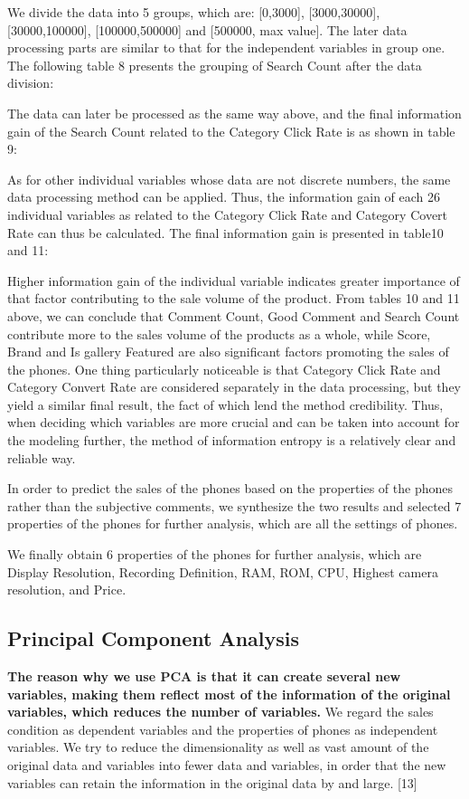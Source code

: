 We divide the data into 5 groups, which are: [0,3000], [3000,30000], [30000,100000], [100000,500000] and [500000, max value]. The later data processing parts are similar to that for the independent variables in group one. The following table 8 presents the grouping of Search Count after the data division:

The data can later be processed as the same way above, and the final information gain of the Search Count related to the Category Click Rate is as shown in table 9:

As for other individual variables whose data are not discrete numbers, the same data processing method can be applied. Thus, the information gain of each 26 individual variables as related to the Category Click Rate and Category Covert Rate can thus be calculated. The final information gain is presented in table10 and 11:

Higher information gain of the individual variable indicates greater importance of that factor contributing to the sale volume of the product. From tables 10 and 11 above, we can conclude that Comment Count, Good Comment and Search Count contribute more to the sales volume of the products as a whole, while Score, Brand and Is gallery Featured are also significant factors promoting the sales of the phones. One thing particularly noticeable is that Category Click Rate and Category Convert Rate are considered separately in the data processing, but they yield a similar final result, the fact of which lend the method credibility. Thus, when deciding which variables are more crucial and can be taken into account for the modeling further, the method of information entropy is a relatively clear and reliable way. 

In order to predict the sales of the phones based on the properties of the phones rather than the subjective comments, we synthesize the two results and selected 7 properties of the phones for further analysis, which are all the settings of phones. 

We finally obtain 6 properties of the phones for further analysis, which are Display Resolution, Recording Definition, RAM, ROM, CPU, Highest camera resolution, and Price.

\subsection{Principal Component Analysis}

\textbf{The reason why we use PCA is that it can create several new variables, making them reflect most of the information of the original variables, which reduces the number of variables. 
}
We regard the sales condition as dependent variables and the properties of phones as independent variables. We try to reduce the dimensionality as well as vast amount of the original data and variables into fewer data and variables, in order that the new variables can retain the information in the original data by and large. [13]

